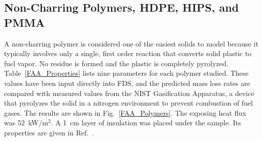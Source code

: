 \subsection{Non-Charring Polymers, HDPE, HIPS, and PMMA}

A non-charring polymer is considered one of the easiest solids to model because it typically involves only a single, first order reaction that converts solid plastic to fuel vapor. No residue is formed and the plastic is completely pyrolyzed. Table~\ref{FAA_Properties} lists nine parameters for each polymer studied. These values have been input directly into FDS, and the predicted mass loss rates are compared with measured values from the NIST Gasification Apparatus, a device that pyrolyzes the solid in a nitrogen environment to prevent combustion of fuel gases. The results are shown in Fig.~\ref{FAA_Polymers}. The exposing heat flux was 52~kW/m$^2$. A 1~cm layer of insulation was placed under the sample. Its properties are given in Ref.~\cite{Stoliarov:CF2009}.

